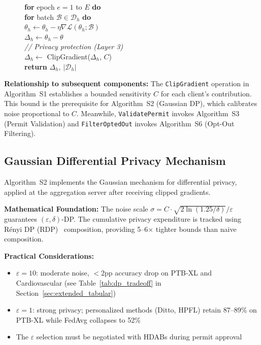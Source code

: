 \documentclass[conference,a4paper]{IEEEtran}
\begin{document}
\begin{figure}[htbp]
{{\hspace*{4mm}\textbf{for} epoch $e = 1$ to $E$ \textbf{do}\\
\hspace*{8mm}\textbf{for} batch $\mathcal{B} \in \mathcal{D}_h$ \textbf{do}\\
\hspace*{12mm}$\theta_h \leftarrow \theta_h - \eta \nabla \mathcal{L}(\theta_h; \mathcal{B})$\\
\hspace*{4mm}$\Delta_h \leftarrow \theta_h - \theta$\\
\hspace*{4mm}\textit{// Privacy protection (Layer 3)}\\
\hspace*{4mm}$\Delta_h \leftarrow$ ClipGradient($\Delta_h$, $C$)\\
\hspace*{4mm}\textbf{return} $\Delta_h$, $|\mathcal{D}_h|$
}}
\end{figure}

\textbf{Relationship to subsequent components:} The \texttt{ClipGradient} operation in Algorithm~S1 establishes a bounded sensitivity $C$ for each client's contribution. This bound is the prerequisite for Algorithm~S2 (Gaussian DP), which calibrates noise proportional to $C$. Meanwhile, \texttt{ValidatePermit} invokes Algorithm~S3 (Permit Validation) and \texttt{FilterOptedOut} invokes Algorithm~S6 (Opt-Out Filtering).

\subsection{Gaussian Differential Privacy Mechanism}

Algorithm~S2 implements the Gaussian mechanism for differential privacy, applied at the aggregation server after receiving clipped gradients.

\textbf{Mathematical Foundation:} The noise scale $\sigma = C \cdot \sqrt{2\ln(1.25/\delta)}/\varepsilon$ guarantees $(\varepsilon, \delta)$-DP. The cumulative privacy expenditure is tracked using R\'enyi DP (RDP)~\cite{mironov2017renyi} composition, providing 5--6$\times$ tighter bounds than naive composition.

\textbf{Practical Considerations:}
\begin{itemize}
    \item $\varepsilon = 10$: moderate noise, $<$2pp accuracy drop on PTB-XL and Cardiovascular (see Table~\ref{tab:dp_tradeoff} in Section~\ref{sec:extended_tabular})
    \item $\varepsilon = 1$: strong privacy; personalized methods (Ditto, HPFL) retain 87--89\% on PTB-XL while FedAvg collapses to 52\%
    \item The $\varepsilon$ selection must be negotiated with HDABs during permit approval
\end{itemize}
\end{document}
